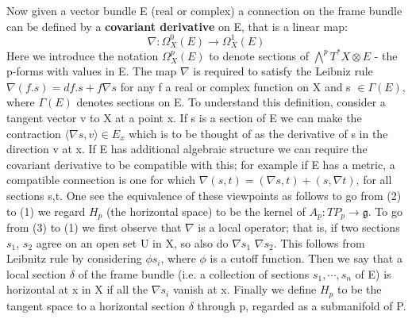 \documentclass[a4paper,10pt]{article}
\begin{document}
Now given a vector bundle E (real or complex) a connection on the frame bundle can be defined by a \textbf{covariant derivative}
on E, that is a linear map:
\begin{equation}
 \nabla: \Omega_{X}^{0}(E) \rightarrow \Omega_X^1(E)
\end{equation}
Here we introduce the notation $\Omega^p_X(E)$ to denote sections of 
$\bigwedge^pT^*X \otimes E$ - the p-forms with values in E. The map 
$\nabla$ is required to satisfy the Leibniz rule 
$\nabla(f.s) = df.s + f\nabla s$ for any f a real or complex function on X and s $\in \Gamma(E)$, where $\Gamma(E)$ 
denotes sections on E. 
   To understand this definition, consider a tangent vector v to X at a point x. If s is a section of E we can make 
   the contraction $\langle \nabla s, v \rangle \in E_x$ which is to be thought of as the derivative of s in the 
   direction v at x. If E has additional algebraic structure we can require the covariant derivative to be compatible 
   with this; for example if E has a metric, a compatible connection is one for which $\nabla(s,t) = (\nabla s, t) + (s, 
   \nabla t)$, for all sections s,t. 
      One see the equivalence of these viewpoints as follows to go from (2) to (1) we regard $H_p$ (the horizontal 
    space) to be the kernel of $A_p: TP_{p} \rightarrow \mathfrak{g}$.
  To go from (3) to (1) we first observe that $\nabla$ is a local operator; that is, if two sections $s_1$, $s_2$
  agree on an open set U in X, so also do $\nabla s_1$ $\nabla s_2$. 
  This follows from Leibnitz rule by considering $\phi s_i$, where $\phi$ is a cutoff function. 
 Then we say that a local section $\delta$ of the frame bundle (i.e. a collection of sections $s_1,\cdots, s_n$ of E)
 is horizontal at x in X if all the $\nabla s_i$ vanish at x. Finally we define $H_p$ to be the tangent space to a 
 horizontal section $\delta$ through p, regarded as a submanifold of P. 
 
\end{document}
